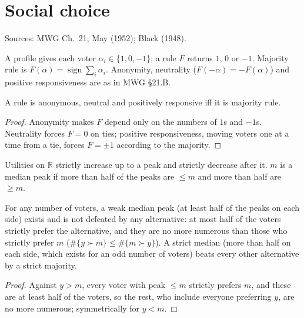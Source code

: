 \chapter{Social choice}
\label{chap:socialchoice}

Sources: MWG Ch.~21; May (1952); Black (1948).

\begin{definition}
\label{def:may}
\leanok
A profile gives each voter $\alpha_i \in \{1, 0, -1\}$; a rule $F$ returns $1$, $0$ or $-1$. Majority rule is
$F(\alpha) = \operatorname{sign}\sum_i \alpha_i$. Anonymity, neutrality ($F(-\alpha) = -F(\alpha)$) and positive
responsiveness are as in MWG §21.B.
\end{definition}

\begin{theorem}
\label{thm:may}
\leanok
{}
A rule is anonymous, neutral and positively responsive iff it is majority rule.
\end{theorem}
\begin{proof}
\leanok
Anonymity makes $F$ depend only on the numbers of $1$s and $-1$s. Neutrality forces $F = 0$ on ties; positive
responsiveness, moving voters one at a time from a tie, forces $F = \pm 1$ according to the majority.
\end{proof}

\begin{definition}
\label{def:single-peaked}
\leanok
Utilities on $\mathbb{R}$ strictly increase up to a peak and strictly decrease after it. $m$ is a median peak if
more than half of the peaks are $\le m$ and more than half are $\ge m$.
\end{definition}

\begin{theorem}
\label{thm:median-voter}
\leanok
{}
For any number of voters, a weak median peak (at least half of the peaks on each side) exists and is not defeated
by any alternative: at most half of the voters strictly prefer the alternative, and they are no more numerous
than those who strictly prefer $m$ ($\#\{y \succ m\} \le \#\{m \succ y\}$). A strict median (more than half on
each side, which exists for an odd number of voters) beats every other alternative by a strict majority.
\end{theorem}
\begin{proof}
\leanok
Against $y > m$, every voter with peak $\le m$ strictly prefers $m$, and these are at least half of the voters,
so the rest, who include everyone preferring $y$, are no more numerous; symmetrically for $y < m$.
\end{proof}
